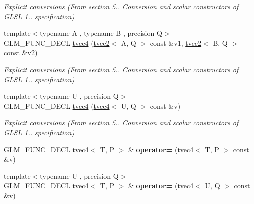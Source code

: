\begin{DoxyCompactItemize}
\begin{DoxyCompactList}\small\item\em Explicit conversions (From section 5.. Conversion and scalar constructors of G\+L\+SL 1.. specification) \end{DoxyCompactList}\item 
{\footnotesize template$<$typename A , typename B , precision Q$>$ }\\G\+L\+M\+\_\+\+F\+U\+N\+C\+\_\+\+D\+E\+CL \hyperlink{structglm_1_1detail_1_1tvec4_a1aa94df5eda41024d31fb335a3a14026}{tvec4} (\hyperlink{structglm_1_1detail_1_1tvec2}{tvec2}$<$ A, Q $>$ const \&v1, \hyperlink{structglm_1_1detail_1_1tvec2}{tvec2}$<$ B, Q $>$ const \&v2)\hypertarget{structglm_1_1detail_1_1tvec4_a1aa94df5eda41024d31fb335a3a14026}{}\label{structglm_1_1detail_1_1tvec4_a1aa94df5eda41024d31fb335a3a14026}

\begin{DoxyCompactList}\small\item\em Explicit conversions (From section 5.. Conversion and scalar constructors of G\+L\+SL 1.. specification) \end{DoxyCompactList}\item 
{\footnotesize template$<$typename U , precision Q$>$ }\\G\+L\+M\+\_\+\+F\+U\+N\+C\+\_\+\+D\+E\+CL \hyperlink{structglm_1_1detail_1_1tvec4_ad57045d32f9c47a4afbb3d7524fe24ee}{tvec4} (\hyperlink{structglm_1_1detail_1_1tvec4}{tvec4}$<$ U, Q $>$ const \&v)\hypertarget{structglm_1_1detail_1_1tvec4_ad57045d32f9c47a4afbb3d7524fe24ee}{}\label{structglm_1_1detail_1_1tvec4_ad57045d32f9c47a4afbb3d7524fe24ee}

\begin{DoxyCompactList}\small\item\em Explicit conversions (From section 5.. Conversion and scalar constructors of G\+L\+SL 1.. specification) \end{DoxyCompactList}\item 
G\+L\+M\+\_\+\+F\+U\+N\+C\+\_\+\+D\+E\+CL \hyperlink{structglm_1_1detail_1_1tvec4}{tvec4}$<$ T, P $>$ \& {\bfseries operator=} (\hyperlink{structglm_1_1detail_1_1tvec4}{tvec4}$<$ T, P $>$ const \&v)\hypertarget{structglm_1_1detail_1_1tvec4_abafc0f4531b7d93b50e63bcdf9bcbf97}{}\label{structglm_1_1detail_1_1tvec4_abafc0f4531b7d93b50e63bcdf9bcbf97}

\item 
{\footnotesize template$<$typename U , precision Q$>$ }\\G\+L\+M\+\_\+\+F\+U\+N\+C\+\_\+\+D\+E\+CL \hyperlink{structglm_1_1detail_1_1tvec4}{tvec4}$<$ T, P $>$ \& {\bfseries operator=} (\hyperlink{structglm_1_1detail_1_1tvec4}{tvec4}$<$ U, Q $>$ const \&v)\hypertarget{structglm_1_1detail_1_1tvec4_a9fc0189acf6230da54693f07ff80d4e7}{}\label{structglm_1_1detail_1_1tvec4_a9fc0189acf6230da54693f07ff80d4e7}


\end{DoxyCompactItemize}
